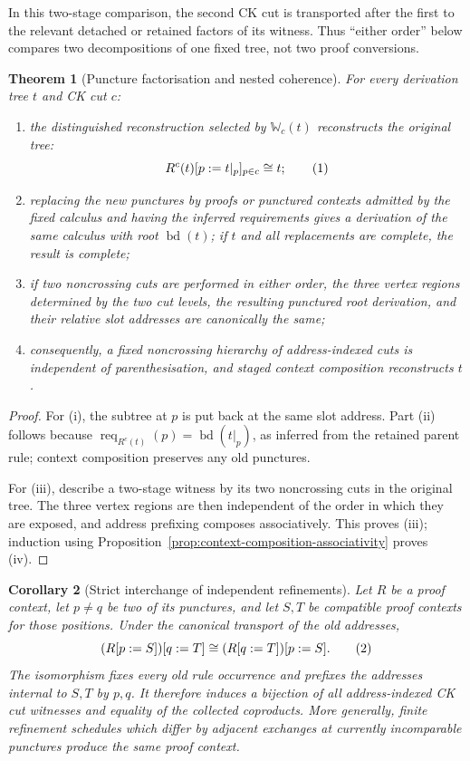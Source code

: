 \documentclass[10pt,a4paper]{article}
\theoremstyle{plain}
\newtheorem{theorem}{Theorem}[section]
\newtheorem{corollary}[theorem]{Corollary}
\theoremstyle{definition}
\theoremstyle{remark}
\newcommand{\rootseq}{\operatorname{bd}}
\newcommand{\Req}{\operatorname{req}}
\newcommand{\eqtag}{\refstepcounter{equation}\tag{\theequation}}
\begin{document}
In this two-stage comparison, the second CK cut is transported after the
first to the relevant detached or retained factors of its witness.  Thus
``either order'' below compares two decompositions of one fixed tree, not
two proof conversions.

\begin{theorem}[Puncture factorisation and nested coherence]
\label{thm:linked-factorisation}
For every derivation tree \(t\) and CK cut \(c\):
\begin{enumerate}[label=(\roman*)]
\item the distinguished reconstruction selected by
\(\mathbb W_c(t)\) reconstructs
the original tree:
\[
 R^c(t)[p:=t|_p]_{p\in c}\cong t;
\eqtag\label{eq:linked-reconstruction}
\]
\item replacing the new punctures by proofs or punctured contexts admitted
by the fixed calculus and having the inferred requirements gives a
derivation of the same calculus with root
\(\rootseq(t)\); if \(t\) and all replacements are complete, the result is
complete;
\item if two noncrossing cuts are performed in either order, the
three vertex regions determined by the two cut levels, the resulting
punctured root derivation, and their relative slot addresses are
canonically the same;
\item consequently, a fixed noncrossing hierarchy of address-indexed
cuts is independent of parenthesisation, and staged context composition
reconstructs \(t\).
\end{enumerate}
\end{theorem}

\begin{proof}
For (i), the subtree at \(p\) is put back at the same slot address.  Part
(ii) follows because \(\Req_{R^c(t)}(p)=\rootseq(t|_p)\), as inferred from
the retained parent rule; context composition preserves any old punctures.

For (iii), describe a two-stage witness by its two noncrossing cuts in
the original tree.  The three vertex regions are then independent of the
order in which they are exposed, and address prefixing composes
associatively.  This proves (iii); induction using
Proposition~\ref{prop:context-composition-associativity} proves (iv).
\end{proof}

\begin{corollary}[Strict interchange of independent refinements]
\label{cor:strict-refinement-interchange}
Let \(R\) be a proof context, let \(p\ne q\) be two of its punctures,
and let \(S,T\) be compatible proof contexts for those positions.  Under
the canonical transport of the old addresses,
\[
       (R[p:=S])[q:=T]\cong (R[q:=T])[p:=S].
\eqtag\label{eq:strict-refinement-interchange}
\]
The isomorphism fixes every old rule occurrence and prefixes the addresses
internal to \(S,T\) by \(p,q\).  It therefore induces a bijection of all
address-indexed CK cut witnesses and equality of the collected
coproducts.  More generally, finite refinement schedules which differ by
adjacent exchanges at currently incomparable punctures produce the same
proof context.
\end{corollary}
\end{document}
